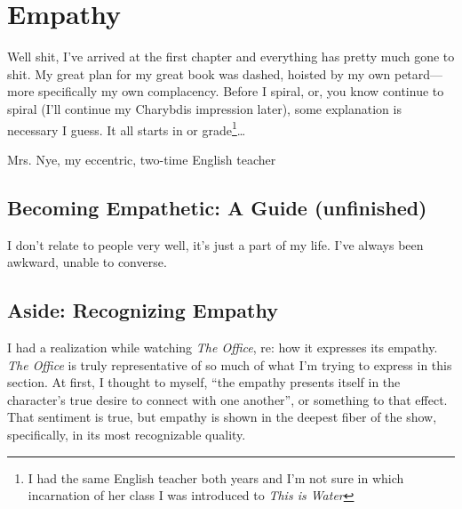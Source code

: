 \documentclass[../butidigress.tex]{subfiles}
\begin{document}
\chapter{Empathy}
\newpage

Well shit, I've arrived at the first chapter and everything has pretty much gone to shit.
My great plan for my great book was dashed, hoisted by my own petard---more specifically my own complacency.
Before I spiral, or, you know continue to spiral (I'll continue my Charybdis impression later), some explanation is necessary I guess.
It all starts in  or  grade\footnote{I had the same English teacher both years and I'm not sure in which incarnation of her class I was introduced to \textit{This is Water}}\ldots

Mrs. Nye, my eccentric, two-time English teacher

\section{Becoming Empathetic: A Guide (unfinished)}
I don't relate to people very well, it's just a part of my life.
I've always been awkward, unable to converse.

\section*{Aside: Recognizing Empathy}
I had a realization while watching \textit{The Office}, re: how it expresses its empathy.
\textit{The Office} is truly representative of so much of what I'm trying to express in this section.
At first, I thought to myself, ``the empathy presents itself in the character's true desire to connect with one another'', or something to that effect.
That sentiment is true, but empathy is shown in the deepest fiber of the show, specifically, in its most recognizable quality.
\end{document}

